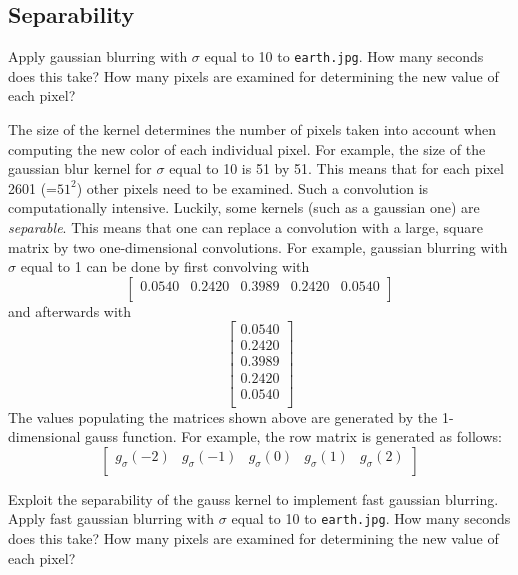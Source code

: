 \documentclass{book}
\begin{document}

\subsection{Separability}

\begin{exercise}
Apply gaussian blurring with $\sigma$ equal to 10 to \texttt{earth.jpg}. How many seconds does this take? How many pixels are examined for determining the new value of each pixel?
\end{exercise}

The size of the kernel determines the number of pixels taken into account when computing the new color of each individual pixel. For example, the size of the gaussian blur kernel for $\sigma$ equal to 10 is 51 by 51. This means that for each pixel 2601 (=$51^2$) other pixels need to be examined. Such a convolution is computationally intensive. Luckily, some kernels (such as a gaussian one) are \emph{separable}. This means that one can replace a convolution with a large, square matrix by two one-dimensional convolutions. For example, gaussian blurring with $\sigma$ equal to 1 can be done by first convolving with 
$$
\begin{bmatrix}
0.0540 & 0.2420 & 0.3989 & 0.2420 & 0.0540\\
\end{bmatrix} 
$$
and afterwards with
$$
\begin{bmatrix}
0.0540\\
0.2420\\
0.3989\\
0.2420\\
0.0540\\
\end{bmatrix} 
$$
The values populating the matrices shown above are generated by the 1-dimensional gauss function. For example, the row matrix is generated as follows:
$$\begin{bmatrix}
g_\sigma(-2) & g_\sigma(-1) & g_\sigma(0) & g_\sigma(1) & g_\sigma(2)\\
\end{bmatrix}$$

\begin{exercise}
Exploit the separability of the gauss kernel to implement fast gaussian blurring. Apply fast gaussian blurring with $\sigma$ equal to 10 to \texttt{earth.jpg}. How many seconds does this take? How many pixels are examined for determining the new value of each pixel?
\end{exercise}
\end{document}
